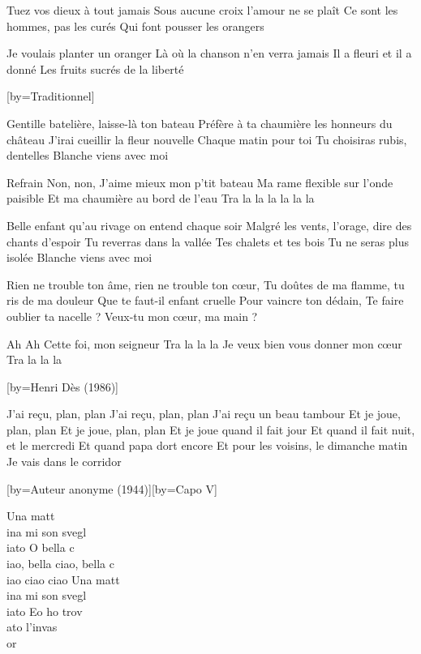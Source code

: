 \beginverse
Tuez vos dieux à tout jamais
Sous aucune croix l'amour ne se plaît
Ce sont les hommes, pas les curés 
Qui font pousser les orangers
\endverse

\beginverse
Je voulais planter un oranger
Là où la chanson n'en verra jamais
Il a fleuri et il a donné
Les fruits sucrés de la liberté
\endverse

[by={Traditionnel}]

\beginverse
Gentille batelière, laisse-là ton bateau
Préfère à ta chaumière les honneurs du château
J'irai cueillir la fleur nouvelle
Chaque matin pour toi
Tu choisiras rubis, dentelles
Blanche viens avec moi \!
\endverse

\beginverse
Refrain	
Non, non, J'aime mieux mon p'tit bateau
Ma rame flexible sur l'onde paisible 
Et ma chaumière au bord de l'eau
Tra la la la la la la
\endverse

\beginverse
Belle enfant qu'au rivage on entend chaque soir
Malgré les vents, l'orage, dire des chants d'espoir \!
Tu reverras dans la vallée
Tes chalets et tes bois
Tu ne seras plus isolée
Blanche viens avec moi \!
\endverse

\beginverse
Rien ne trouble ton âme, rien ne trouble ton cœur, 
Tu doûtes de ma flamme, tu ris de ma douleur
Que te faut-il enfant cruelle Pour vaincre ton dédain,
Te faire oublier ta nacelle ?
Veux-tu mon cœur, ma main ?
\endverse

\beginverse
Ah \! Ah \! Cette foi, mon seigneur
Tra la la la
Je veux bien vous donner mon cœur
Tra la la la
\endverse

[by={Henri Dès (1986)}]

\beginverse
J'ai reçu, plan, plan
J'ai reçu, plan, plan
J'ai reçu un beau tambour
Et je joue, plan, plan
Et je joue, plan, plan
Et je joue quand il fait jour
Et quand il fait nuit, et le mercredi
Et quand papa dort encore
Et pour les voisins, le dimanche matin
Je vais dans le corridor
\\[6x]
\endverse

[by={Auteur anonyme (1944)}][by={Capo V}]

\beginverse
Una matt\\[Lam]ina mi son svegl\\[Lam]iato
O bella c\\[Lam]iao, bella ciao, bella c\\[Mi7]iao ciao ciao
Una matt\\[Rém]ina mi son svegl\\[Lam]iato
Eo ho trov\\[Mi7]ato l'invas\\[Lam]or
\endverse

